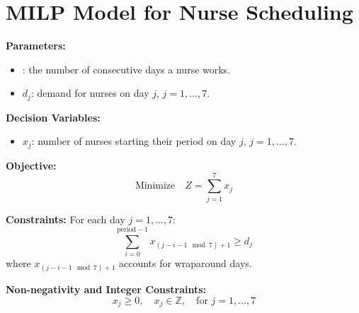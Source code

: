 \documentclass{article}
\begin{document}
\section*{MILP Model for Nurse Scheduling}

\textbf{Parameters:}
\begin{itemize}
    \item {}: the number of consecutive days a nurse works.
    \item \( d_j \): demand for nurses on day \( j \), \( j = 1, \ldots, 7 \).
\end{itemize}

\textbf{Decision Variables:}
\begin{itemize}
    \item \( x_j \): number of nurses starting their period on day \( j \), \( j = 1, \ldots, 7 \).
\end{itemize}

\textbf{Objective:}
\[
\text{Minimize} \quad Z = \sum_{j=1}^{7} x_j
\]

\textbf{Constraints:}
For each day \( j = 1, \ldots, 7 \):
\[
\sum_{i=0}^{\text{period}-1} x_{(j-i-1 \mod 7) + 1} \ge d_j
\]
where \( x_{(j-i-1 \mod 7) + 1} \) accounts for wraparound days.

\textbf{Non-negativity and Integer Constraints:}
\[
x_j \ge 0, \quad x_j \in \mathbb{Z}, \quad \text{for } j = 1, \ldots, 7
\]
\end{document}

